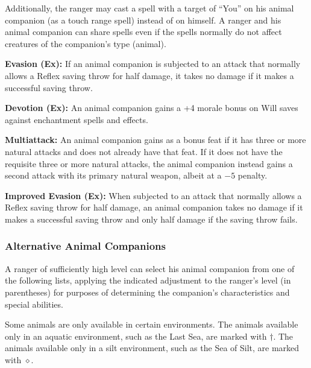 Additionally, the ranger may cast a spell with a target of ``You'' on his animal companion (as a touch range spell) instead of on himself. A ranger and his animal companion can share spells even if the spells normally do not affect creatures of the companion's type (animal).

\textbf{Evasion (Ex):} If an animal companion is subjected to an attack that normally allows a Reflex saving throw for half damage, it takes no damage if it makes a successful saving throw.

\textbf{Devotion (Ex):} An animal companion gains a +4 morale bonus on Will saves against enchantment spells and effects.

\textbf{Multiattack:} An animal companion gains  as a bonus feat if it has three or more natural attacks and does not already have that feat. If it does not have the requisite three or more natural attacks, the animal companion instead gains a second attack with its primary natural weapon, albeit at a $-5$ penalty.

\textbf{Improved Evasion (Ex):} When subjected to an attack that normally allows a Reflex saving throw for half damage, an animal companion takes no damage if it makes a successful saving throw and only half damage if the saving throw fails.

\subsubsection{Alternative Animal Companions}
A ranger of sufficiently high level can select his animal companion from one of the following lists, applying the indicated adjustment to the ranger's level (in parentheses) for purposes of determining the companion's characteristics and special abilities.

Some animals are only available in certain environments. The animals available only in an aquatic environment, such as the Last Sea, are marked with $\dagger$. The animals available only in a silt environment, such as the Sea of Silt, are marked with $\diamond$.


